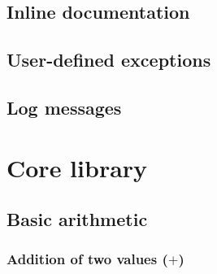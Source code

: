 \documentclass{article}
\theoremstyle{definition}
\begin{document}

\hypertarget{hsec:inline-doc}{}
\subsection{Inline documentation}
\label{sec:inline-doc}


\hypertarget{hsec:exception-form}{}
\subsection{User-defined exceptions}
\label{sec:exception-form}


\hypertarget{hsec:logs}{}
\subsection{Log messages}
\label{sec:logs}


\pagebreak

\section{Core library}

\subsection{Basic arithmetic}

\subsubsection{Addition of two values ($+$)}
\end{document}
